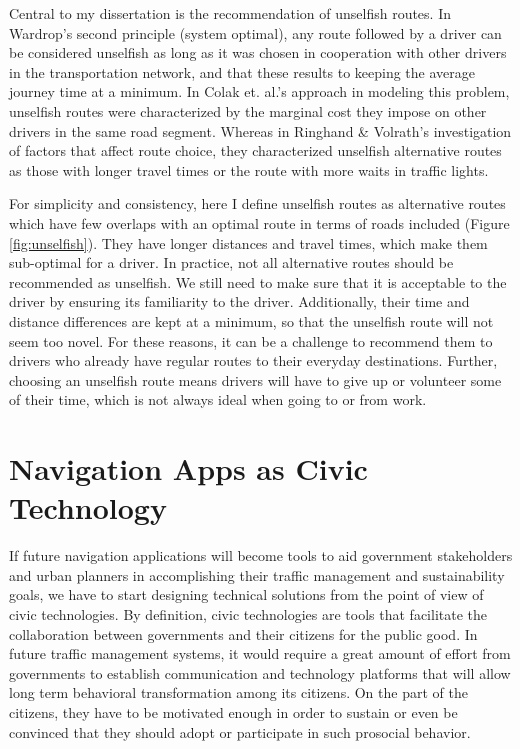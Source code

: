 Central to my dissertation is the recommendation of unselfish routes. In Wardrop's second principle (system optimal)\cite{wardrop1952road}, any route followed by a driver can be considered unselfish as long as it was chosen in cooperation with other drivers in the transportation network, and that these results to keeping the average journey time at a minimum. In Colak et. al.'s approach in modeling this problem, unselfish routes were characterized by the marginal cost they impose on other drivers in the same road segment\cite{colak2016understanding}. Whereas in Ringhand \& Volrath's investigation of factors that affect route choice, they characterized unselfish alternative routes as those with longer travel times or the route with more waits in traffic lights\cite{ringhand2018make}. 

For simplicity and consistency, here I define unselfish routes as alternative routes which have few overlaps with an optimal route in terms of roads included (Figure \ref{fig:unselfish}). They have longer distances and travel times, which make them sub-optimal for a driver. In practice, not all alternative routes should be recommended as unselfish. We still need to make sure that it is acceptable to the driver by ensuring its familiarity to the driver. Additionally, their time and distance differences are kept at a minimum, so that the unselfish route will not seem too novel. For these reasons, it can be a challenge to recommend them to drivers who already have regular routes to their everyday destinations. Further, choosing an unselfish route means drivers will have to give up or volunteer some of their time, which is not always ideal when going to or from work. 

\section{Navigation Apps as Civic Technology}

If future navigation applications will become tools to aid government stakeholders and urban planners in accomplishing their traffic management and sustainability goals, we have to start designing technical solutions from the point of view of civic technologies. By definition, civic technologies are tools that facilitate the collaboration between governments and their citizens for the public good\cite{Mandarano2010Civic}. In future traffic management systems, it would require a great amount of effort from governments to establish communication and technology platforms that will allow long term behavioral transformation among its citizens. On the part of the citizens, they have to be motivated enough in order to sustain or even be convinced that they should adopt or participate in such prosocial behavior. 

